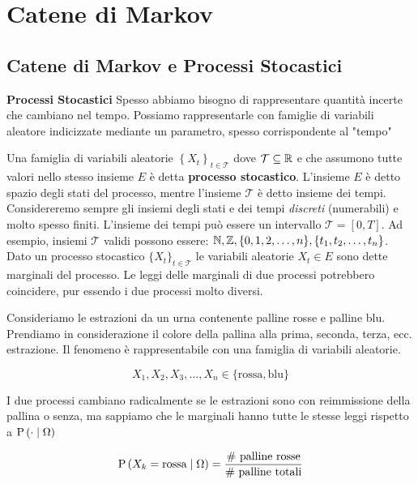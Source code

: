 \chapter{Catene di Markov}

\section{Catene di Markov e Processi Stocastici}

\begin{defn}
	\textbf{Processi Stocastici}
	Spesso abbiamo bisogno di rappresentare quantit\`a incerte che cambiano nel tempo. Possiamo rappresentarle con famiglie di variabili aleatore indicizzate mediante un parametro, spesso corrispondente al "tempo"
	
	Una famiglia di variabili aleatorie $ \left\{X_t\right\}_{t\in \mathcal{T}} $ dove $ \mathcal{T} \subseteq \mathbb{R} $ e che assumono tutte valori nello stesso insieme $ E $ \`e detta \textbf{processo stocastico}. L'insieme $ E $ \`e detto spazio degli stati del processo, mentre l'insieme $ \mathcal{T} $ \`e detto insieme dei tempi. Considereremo sempre gli insiemi degli stati e dei tempi \textit{discreti} (numerabili) e molto spesso finiti. L'insieme dei tempi pu\`o essere un intervallo $ \mathcal{T} = [0,T] $. Ad esempio, insiemi $ \mathcal{T} $ validi possono essere: $ \mathbb{N}, \mathbb{Z}, \{0, 1, 2, \hdots, n\}, \{t_1, t_2, \hdots, t_n\} $. Dato un processo stocastico $ \{X_t\}_{t \in \mathcal{T}} $ le variabili aleatorie $ X_t \in E $ sono dette marginali del processo. Le leggi delle marginali di due processi potrebbero coincidere, pur essendo i due processi molto diversi.
	
\end{defn}


\begin{exmp}
	
	Consideriamo le estrazioni da un urna contenente palline rosse e palline blu. Prendiamo in considerazione il colore della pallina alla prima, seconda, terza, ecc. estrazione. Il fenomeno \`e rappresentabile con una famiglia di variabili aleatorie.
	
	\begin{equation*}
	X_1, X_2, X_3, \hdots, X_n \in \{\text{rossa}, \text{blu}\}
	\end{equation*}
	
	I due processi cambiano radicalmente se le estrazioni sono con reimmissione della pallina o senza, ma sappiamo che le marginali hanno tutte le stesse leggi rispetto a $ \text{P}\left(\cdot \mid \Omega\right) $
	
	\begin{equation*}
	\text{P}\left(X_k = \text{rossa} \mid \Omega\right) = \dfrac{\text{\# palline rosse}}{\text{\# palline totali}}
	\end{equation*}
	
\end{exmp}

